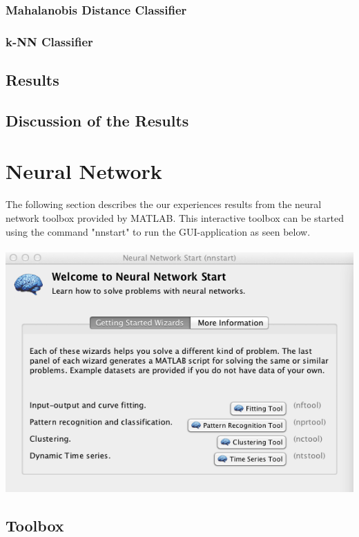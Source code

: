 \documentclass[subfigure,epsfig,fleqn,float,ausarbeitung]{scrartcl}
\begin{document}
\subsubsection{Mahalanobis Distance Classifier}

\subsubsection{k-NN Classifier}

\subsection{Results}

\subsection{Discussion of the Results}


\section{Neural Network}

The following section describes the our experiences results from the neural network toolbox provided by MATLAB. This interactive toolbox can be started using the command "nnstart" to run the GUI-application as seen below.
~\\ ~\\
\includegraphics[scale=0.78]{img/nn/toolbox_start.png}

\subsection{Toolbox}
\end{document}
